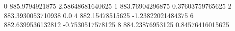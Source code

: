 0 885.9794921875 2.58648681640625
1 883.76904296875 0.37603759765625
2 883.3930053710938 0.0
4 882.15478515625 -1.23822021484375
6 882.6399536132812 -0.7530517578125
8 884.23876953125 0.84576416015625
